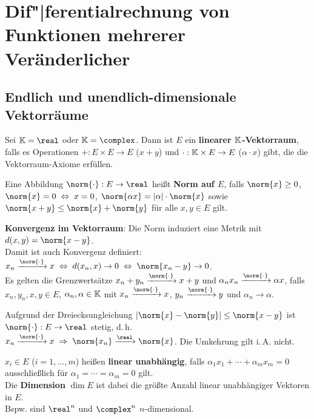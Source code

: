 \chapter{%
    Dif"|ferentialrechnung von Funktionen mehrerer Veränderlicher%
}

\section{%
    Endlich und unendlich-dimensionale Vektorräume%
}

Sei $\field = \real$ oder $\field = \complex$.
Dann ist $E$ ein \textbf{linearer $\mathbb{K}$-Vektorraum}, falls
es Operationen $+: E \times E \rightarrow E$ ($x + y$) und
$\cdot: \mathbb{K} \times E \rightarrow E$ ($\alpha \cdot x$) gibt, die
die Vektorraum-Axiome erfüllen.

Eine Abbildung $\norm{\cdot}: E \rightarrow \real$ heißt \textbf{Norm auf $E$},
falls $\norm{x} \ge 0$, $\norm{x} = 0 \;\Leftrightarrow\; x = 0$,
$\norm{\alpha x} = |\alpha| \cdot \norm{x}$ sowie
$\norm{x + y} \le \norm{x} + \norm{y}$ für alle $x, y \in E$ gilt.

\textbf{Konvergenz im Vektorraum}:
Die Norm induziert eine Metrik mit $d(x, y) = \norm{x - y}$. \\
Damit ist auch Konvergenz definiert:
$x_n \xrightarrow{\norm{\cdot}} x \;\Leftrightarrow\; d(x_n, x) \to 0
\;\Leftrightarrow\; \norm{x_n - y} \to 0$. \\
Es gelten die Grenzwertsätze $x_n + y_n \xrightarrow{\norm{\cdot}} x + y$
und $\alpha_n x_n \xrightarrow{\norm{\cdot}} \alpha x$, falls
$x_n, y_n, x, y \in E$, $\alpha_n, \alpha \in \mathbb{K}$ mit
$x_n \xrightarrow{\norm{\cdot}} x$,
$y_n \xrightarrow{\norm{\cdot}} y$ und $\alpha_n \to \alpha$.

Aufgrund der Dreiecksungleichung $|\norm{x} - \norm{y}| \le \norm{x - y}$
ist $\norm{\cdot}: E \rightarrow \real$ stetig, d.\,h. \\
$x_n \xrightarrow{\norm{\cdot}} x \;\Rightarrow\;
\norm{x_n} \xrightarrow{\real} \norm{x}$.
Die Umkehrung gilt i.\,A. nicht.

\linie

$x_i \in E$ ($i = 1, \dotsc, m$) heißen \textbf{linear unabhängig}, falls
$\alpha_1 x_1 + \dotsb + \alpha_m x_m = 0$ ausschließlich für
$\alpha_1 = \dotsb = \alpha_m = 0$ gilt. \\
Die \textbf{Dimension} $\dim E$ ist dabei die größte Anzahl linear unabhängiger
Vektoren in $E$. \\
Bspw. sind $\real^n$ und $\complex^n$ $n$-dimensional.

